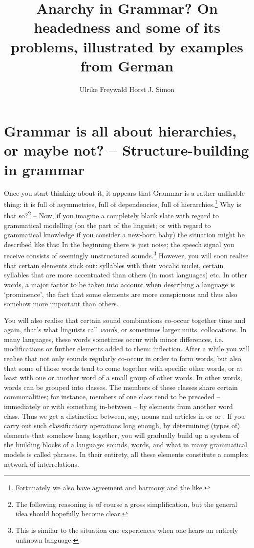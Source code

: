 \documentclass[output=paper
  ,nobabel
  ,draftmode
  ,colorlinks, citecolor=brown
]{langscibook}
\title[Anarchy in Grammar?]{Anarchy in Grammar? On headedness and some of its problems, illustrated by examples from German}
\author{Ulrike Freywald\orcid{0000-0003-3268-7874}\affiliation{TU Dortmund} \lastand Horst J. Simon\orcid{0000-0002-6367-2969}\affiliation{Freie Universität Berlin}}
\begin{document}
\maketitle

\section{Grammar is all about hierarchies, or maybe not? – Structure-building in grammar}

\largerpage
Once you start thinking about it, it appears that Grammar is a rather unlikable thing: it is full of
asymmetries, full of dependencies, full of hierarchies.\footnote{Fortunately we also have agreement
  and harmony and the like.} Why is that so?\footnote{The following reasoning is of course a gross
  simplification, but the general idea should hopefully become clear.} – Now, if you imagine a
completely blank slate with regard to grammatical modelling (on the part of the linguist; or with
regard to grammatical knowledge if you consider a new-born baby) the situation might be described
like this: In the beginning there is just noise; the speech signal you receive consists of seemingly
unstructured sounds.\footnote{This is similar to the situation one experiences when one hears an
  entirely unknown language.} However, you will soon realise that certain elements stick out:
syllables with their vocalic nuclei, certain syllables that are more accentuated than others (in
most languages) etc. In other words, a major factor to be taken into account when describing a
language is `prominence', the fact that some elements are more conspicuous and thus also somehow
more important than others.

You will also realise that certain sound combinations co-occur together time and again, that's what
linguists call \emph{words}, or sometimes larger units, collocations. In many languages, these
words sometimes occur with minor differences, i.e. modifications or further elements added to them:
inflection. After a while you will realise that not only sounds regularly co-occur in order to form
words, but also that some of those words tend to come together with specific other words, or at
least with one or another word of a small group of other words. In other words, words can be grouped
into classes. The members of these classes share certain commonalities; for instance, members of one
class tend to be preceded – immediately or with something in-between – by elements from another word
class. Thus we get a distinction between, say, nouns and articles in  or  or . If
you carry out such classificatory operations long enough, by determining (types of) elements that
somehow hang together, you will gradually build up a system of the building blocks of a language:
sounds, words, and what in many grammatical models is called phrases. In their entirety, all these
elements constitute a complex network of interrelations.
\end{document}
